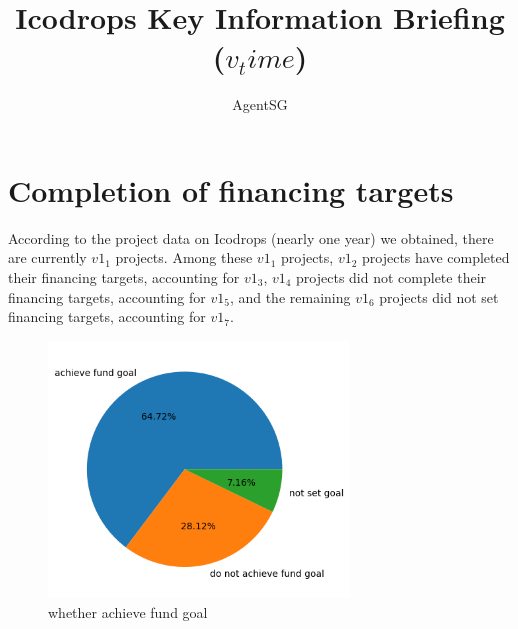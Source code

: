 \documentclass{TTP}
\renewcommand{\large}{\fontsize{14}{18pt}\selectfont}
\renewcommand{\small}{\fontsize{11}{13.6pt}\selectfont}
\newcommand{\authorformat}{\sffamily \large}              %
\newcommand{\email}{\sffamily \small \vspace{-8pt}}           %
\begin{document}
\title{Icodrops Key Information Briefing ($v_time$)}


\author{AgentSG}

\maketitle



\section{Completion of financing targets}
According to the project data on Icodrops (nearly one year) we obtained, there are currently $v1_1$ projects. Among these $v1_1$ projects, $v1_2$ projects have completed their financing targets, accounting for $v1_3$, $v1_4$ projects did not complete their financing targets, accounting for $v1_5$, and the remaining $v1_6$ projects did not set financing targets, accounting for $v1_7$.
\begin{figure}[h]
  \centering
  \includegraphics[width=8cm]{whether_achieve_fund_goal}
  \caption{whether achieve fund goal}
\end{figure}
\end{document}
